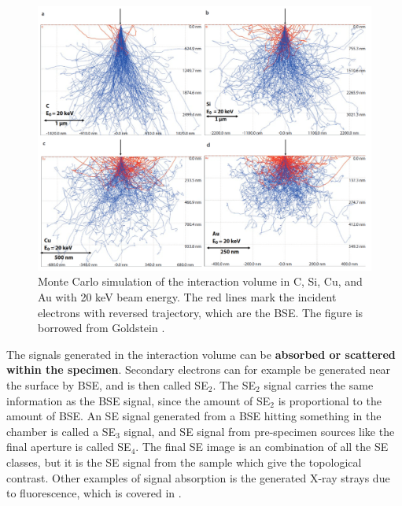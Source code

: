 \begin{figure}[ht]
    \centering
    \includegraphics[width=0.8\linewidth]{figures/SEM_montecarlo_BSE.png}
    \caption{
        Monte Carlo simulation of the interaction volume in C, Si, Cu, and Au with 20 keV beam energy.
        The red lines mark the incident electrons with reversed trajectory, which are the BSE.
        The figure is borrowed from Goldstein \cite[Fig. 2.2]{goldstein_scanning_2018}.
    }
    \label{fig:montecarlo_BSE}
\end{figure}


The signals generated in the interaction volume can be \textbf{absorbed or scattered within the specimen}.
Secondary electrons can for example be generated near the surface by BSE, and is then called SE$_2$.
The SE$_2$ signal carries the same information as the BSE signal, since the amount of SE$_2$ is proportional to the amount of BSE.
An SE signal generated from a BSE hitting something in the chamber is called a SE$_3$ signal, and SE signal from pre-specimen sources like the final aperture is called SE$_4$.
The final SE image is an combination of all the SE classes, but it is the SE signal from the sample which give the topological contrast.
Other examples of signal absorption is the generated X-ray strays due to fluorescence, which is covered in .



